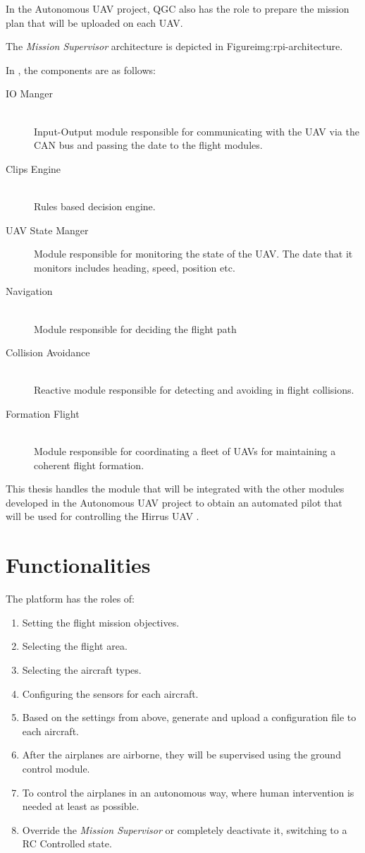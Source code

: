 In the Autonomous UAV project, QGC also has the role to prepare the mission plan
that will be uploaded on each UAV.

The \textit {Mission Supervisor} architecture is depicted in  
{Figure}{img:rpi-architecture}.

\newpage
In , the components are as
follows:
\begin{description}
\item [IO Manger] \hfill \\
Input-Output module responsible for communicating with the UAV via the CAN bus 
and passing the date to the flight modules.
\item [Clips Engine] \hfill \\
Rules based decision engine.
\item [UAV State Manger] Module responsible for monitoring the state of the UAV.
The date that it monitors includes heading, speed,  position etc.
\item [Navigation] \hfill \\
Module responsible for deciding the flight path
\item [Collision Avoidance] \hfill \\
Reactive module responsible for detecting and avoiding in flight collisions.
\item [Formation Flight] \hfill \\
Module responsible for coordinating a fleet of UAVs for maintaining a coherent
flight formation.
\end{description}

This thesis handles the \project module that will be integrated with the other
modules developed in the Autonomous UAV project to obtain an automated pilot
that will be used for controlling the Hirrus UAV \cite{hirrus}.

\section{Functionalities}
\label{sec:functionalities}

The platform has the roles of:
\begin{enumerate}
\item Setting the flight mission objectives.
\item Selecting the flight area.
\item Selecting the aircraft types.
\item Configuring the sensors for each aircraft.
\item Based on the settings from above, generate and upload a configuration file
to each aircraft.
\item After the airplanes are airborne, they will be supervised using the 
ground control module.
\item To control the airplanes in an autonomous way, where human intervention is
needed at least as possible.
\item Override the \textit{Mission Supervisor} or completely deactivate it, 
switching to a RC Controlled state.
\end{enumerate}

